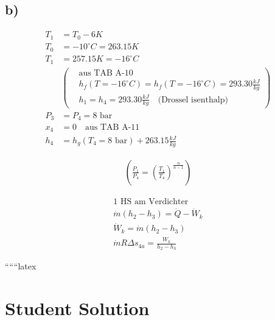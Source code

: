 

\subsection*{b)}

\begin{align*}
    T_1 &= T_0 - 6K \\
    T_0 &= -10^\circ C = 263.15K \\
    T_1 &= 257.15K = -16^\circ C \\
    &\left( 
    \begin{aligned}
        &\text{aus TAB A-10} \\
        &h_f (T = -16^\circ C) = h_f (T = -16^\circ C) = 293.30 \frac{kJ}{kg} \\
        &h_1 = h_4 = 293.30 \frac{kJ}{kg} \quad \text{(Drossel isenthalp)}
    \end{aligned}
    \right) \\
    P_3 &= P_4 = 8 \text{ bar} \\
    x_4 &= 0 \quad \text{aus TAB A-11} \\
    h_4 &= h_g (T_4 = 8 \text{ bar}) + 263.15 \frac{kJ}{kg}
\end{align*}

\begin{align*}
    \left( 
    \frac{P_1}{P_4} = \left( \frac{T_1}{T_4} \right)^{\frac{n}{n-1}}
    \right)
\end{align*}

\begin{align*}
    1 \text{ HS am Verdichter} \\
    \dot{m} \left( h_2 - h_3 \right) = \dot{Q} - \dot{W}_k \\
    \dot{W}_k = \dot{m} \left( h_2 - h_3 \right) \\
    \dot{m} R \Delta s_{4a} = \frac{W_k}{h_2 - h_3}
\end{align*}

``````latex


\section*{Student Solution}